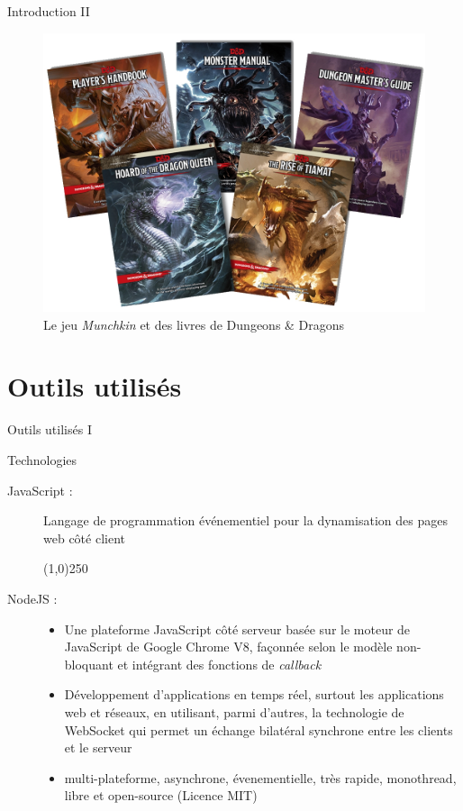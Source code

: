 \documentclass{bredelebeamer}
\begin{document}
\begin{frame}{Introduction II}
\begin{figure}
    	\includegraphics[scale=0.13]{dungeons-dragons}
    	\caption{Le jeu \textit{Munchkin} et des livres de Dungeons \& Dragons}
    \end{figure}
 \end{frame}

  \section{Outils utilisés}
  \begin{frame}{Outils utilisés I}
    \begin{block}{Technologies}
      \begin{description}
        \item [JavaScript :]{
        Langage de programmation événementiel pour la dynamisation des pages web côté client
        }
        \pause
        \begin{center}
          \line(1,0){250}
        \end{center}
        \item [NodeJS :]{
          \begin{itemize}
            \item {Une plateforme JavaScript côté serveur basée sur le moteur de JavaScript de Google Chrome V8, façonnée selon le modèle non-bloquant et intégrant des fonctions de \textit{callback}}
            \pause
            \item {Développement d'applications en temps réel, surtout les applications web et réseaux, en utilisant, parmi d'autres, la technologie de WebSocket qui permet un échange bilatéral synchrone entre les clients et le serveur}
            \pause
            \item {multi-plateforme, asynchrone, évenementielle, très rapide, monothread, libre et open-source (Licence MIT)}
          \end{itemize}
        }
      \end{description}
    \end{block}
  \end{frame}
\end{document}
